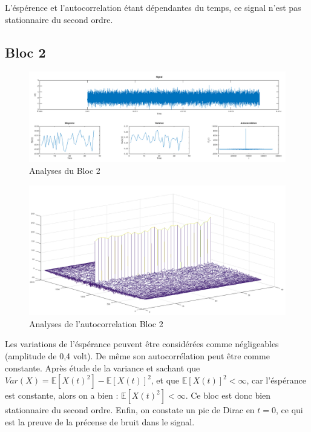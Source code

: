 \documentclass[french, a4paper, 12pt, openany]{book}
\begin{document}
	L'éspérence et l'autocorrelation étant dépendantes du temps, ce signal n'est pas stationnaire du second ordre.
  \subsection{Bloc 2}

	\begin{figure}[ht]
		\begin{center}
		\includegraphics[scale=0.25]{images/SignalBloc2.png}
		\end{center}
		\caption{Analyses du Bloc 2}
		\label{Analyses du Bloc 2}
	\end{figure}

	\begin{figure}[ht]
		\begin{center}
		\includegraphics[scale=0.25]{images/AutoCorrBloc2.png}
		\end{center}
		\caption{Analyses de l'autocorrelation Bloc 2}
		\label{Analyses de l'autocorrelation Bloc 2}
	\end{figure}

	Les variations de l'éspérance peuvent être considérées comme négligeables (amplitude de 0,4 volt). De même son autocorrélation peut être comme constante.
	Après étude de la variance et sachant que \begin{math}Var(X) = \mathbb{E}[X(t)^2] - \mathbb{E}[X(t)]^2\end{math}, et que \begin{math}\mathbb{E}[X(t)]^2<\infty\end{math}, car l'éspérance est constante, alors on a bien : \begin{math}\mathbb{E}[X(t)^2]<\infty\end{math}. Ce bloc est donc bien stationnaire du second ordre.
	Enfin, on constate un pic de Dirac en \(t = 0\), ce qui est la preuve de la précense de bruit dans le signal.
\end{document}
